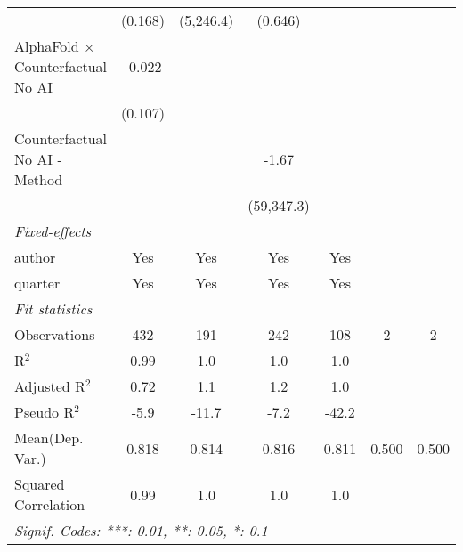 \begin{tabular}{lcccccc}
                                            & (0.168)        & (5,246.4)      & (0.646)    &                &     &   \\   
   AlphaFold $\times$ Counterfactual No AI  & -0.022         &                &            &                &     &   \\   
                                            & (0.107)        &                &            &                &     &   \\   
   Counterfactual No AI - Method            &                &                & -1.67      &                &     &   \\   
                                            &                &                & (59,347.3) &                &     &   \\   
   \midrule
   \emph{Fixed-effects}\\
   author                                   & Yes            & Yes            & Yes        & Yes            &     & \\  
   quarter                                  & Yes            & Yes            & Yes        & Yes            &     & \\  
   \midrule
   \emph{Fit statistics}\\
   Observations                             & 432            & 191            & 242        & 108            & 2   & 2\\  
   R$^2$                                    & 0.99           & 1.0            & 1.0        & 1.0            &     & \\  
   Adjusted R$^2$                           & 0.72           & 1.1            & 1.2        & 1.0            &     & \\  
   Pseudo R$^2$                             & -5.9           & -11.7          & -7.2       & -42.2          &     & \\  
Mean(Dep. Var.) & 0.818 & 0.814 & 0.816 & 0.811 & 0.500 & 0.500 \\
   Squared Correlation                      & 0.99           & 1.0            & 1.0        & 1.0            &     & \\  
   \midrule \midrule
   \multicolumn{7}{l}{\emph{Signif. Codes: ***: 0.01, **: 0.05, *: 0.1}}\\
\end{tabular}
\par\endgroup
